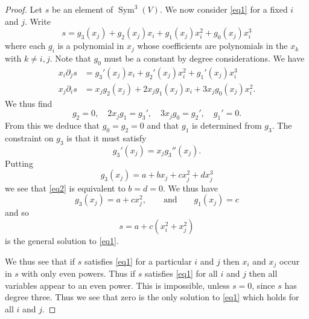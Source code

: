 \documentclass{amsart}
\theoremstyle{definition}
\theoremstyle{remark}
\DeclareMathOperator{\Sym}{Sym}
\begin{document}
\begin{proof}
Let $s$ be an element of $\Sym^3(V)$.  We now consider \eqref{eq1} for a fixed
$i$ and $j$.  Write
\begin{displaymath}
s=g_3(x_j)+g_2(x_j) x_i+g_1(x_j) x_i^2+g_0(x_j) x_i^3
\end{displaymath}
where each $g_i$ is a polynomial in $x_j$ whose coefficients are polynomials
in the $x_k$ with $k \ne i, j$.  Note that $g_0$ must be a constant by
degree considerations.  We have
\begin{displaymath}
\begin{split}
x_i \partial_j s &=  g_3'(x_j) x_i + g_2'(x_j) x_i^2 + g_1'(x_j) x_i^3 \\
x_j \partial_i s &= x_j g_2(x_j)+2 x_j g_1(x_j) x_i+3 x_j g_0(x_j) x_i^2.
\end{split}
\end{displaymath}
We thus find
\begin{displaymath}
g_2=0, \quad 2x_j g_1=g_3', \quad 3 x_j g_0=g_2', \quad g_1'=0.
\end{displaymath}
{}From this we deduce that $g_0=g_2=0$ and that $g_1$ is determined from
$g_3$.  The constraint on $g_3$ is that it must satisfy
\begin{equation}
\label{eq2}
g_3'(x_j)=x_j g_3''(x_j).
\end{equation}
Putting
\begin{displaymath}
g_3(x_j)=a+b x_j+c x_j^2+d x_j^3
\end{displaymath}
we see that \eqref{eq2} is equivalent to $b=d=0$.  We thus have
\begin{displaymath}
g_3(x_j)=a+c x_j^2, \qquad \textrm{and} \qquad g_1(x_j)=c
\end{displaymath}
and so
\begin{displaymath}
s = a + c (x_i^2+ x_j^2)
\end{displaymath}
is the general solution to \eqref{eq1}.

We thus see that if $s$ satisfies \eqref{eq1} for a particular $i$ and $j$
then $x_i$ and $x_j$ occur in $s$ with only even powers.  Thus if $s$
satisfies \eqref{eq1} for all $i$ and $j$ then all variables appear to an
even power.  This is impossible, unless $s=0$, since $s$ has degree three.
Thus we see that zero is the only solution to \eqref{eq1} which holds for
all $i$ and $j$.
\end{proof}
\end{document}
